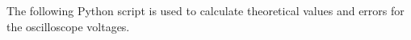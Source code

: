 The following Python script is used to calculate theoretical values and errors for the oscilloscope voltages.

